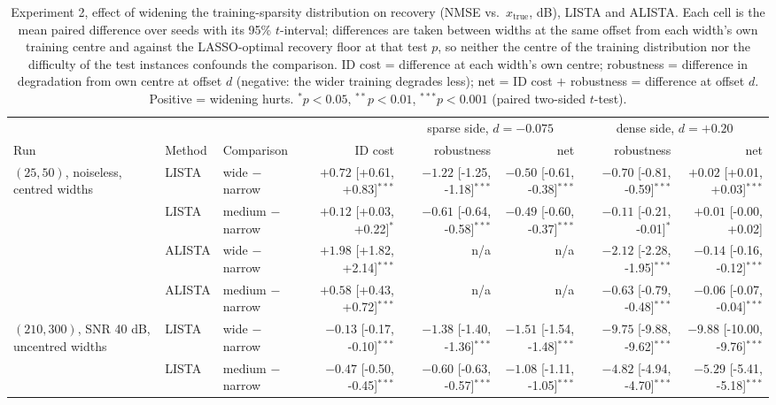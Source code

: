 \begin{table}[htbp]
\centering
\small
\caption{Experiment 2, effect of widening the training-sparsity distribution on recovery (NMSE vs.\ $x_\mathrm{true}$, dB), LISTA and ALISTA. Each cell is the mean paired difference over seeds with its 95\% $t$-interval; differences are taken between widths at the same offset from each width's own training centre and against the LASSO-optimal recovery floor at that test $p$, so neither the centre of the training distribution nor the difficulty of the test instances confounds the comparison. ID cost = difference at each width's own centre; robustness = difference in degradation from own centre at offset $d$ (negative: the wider training degrades less); net = ID cost $+$ robustness = difference at offset $d$. Positive = widening hurts. $^{*}p<0.05$, $^{**}p<0.01$, $^{***}p<0.001$ (paired two-sided $t$-test).}
\label{tab:exp2-width-tradeoff}
\begin{tabular}{@{} l l l r rr rr @{}}
\toprule
& & & & \multicolumn{2}{c}{sparse side, $d=-0.075$} & \multicolumn{2}{c}{dense side, $d=+0.20$} \\
\cmidrule(lr){5-6} \cmidrule(lr){7-8}
Run & Method & Comparison & ID cost & robustness & net & robustness & net \\
\midrule
$(25,50)$, noiseless, centred widths & LISTA & wide $-$ narrow & $+0.72$ [+0.61, +0.83]$^{***}$ & $-1.22$ [-1.25, -1.18]$^{***}$ & $-0.50$ [-0.61, -0.38]$^{***}$ & $-0.70$ [-0.81, -0.59]$^{***}$ & $+0.02$ [+0.01, +0.03]$^{***}$ \\
 & LISTA & medium $-$ narrow & $+0.12$ [+0.03, +0.22]$^{*}$ & $-0.61$ [-0.64, -0.58]$^{***}$ & $-0.49$ [-0.60, -0.37]$^{***}$ & $-0.11$ [-0.21, -0.01]$^{*}$ & $+0.01$ [-0.00, +0.02] \\
 & ALISTA & wide $-$ narrow & $+1.98$ [+1.82, +2.14]$^{***}$ & n/a & n/a & $-2.12$ [-2.28, -1.95]$^{***}$ & $-0.14$ [-0.16, -0.12]$^{***}$ \\
 & ALISTA & medium $-$ narrow & $+0.58$ [+0.43, +0.72]$^{***}$ & n/a & n/a & $-0.63$ [-0.79, -0.48]$^{***}$ & $-0.06$ [-0.07, -0.04]$^{***}$ \\
\addlinespace
$(210,300)$, SNR 40 dB, uncentred widths & LISTA & wide $-$ narrow & $-0.13$ [-0.17, -0.10]$^{***}$ & $-1.38$ [-1.40, -1.36]$^{***}$ & $-1.51$ [-1.54, -1.48]$^{***}$ & $-9.75$ [-9.88, -9.62]$^{***}$ & $-9.88$ [-10.00, -9.76]$^{***}$ \\
 & LISTA & medium $-$ narrow & $-0.47$ [-0.50, -0.45]$^{***}$ & $-0.60$ [-0.63, -0.57]$^{***}$ & $-1.08$ [-1.11, -1.05]$^{***}$ & $-4.82$ [-4.94, -4.70]$^{***}$ & $-5.29$ [-5.41, -5.18]$^{***}$ \\

\end{tabular}
\end{table}
